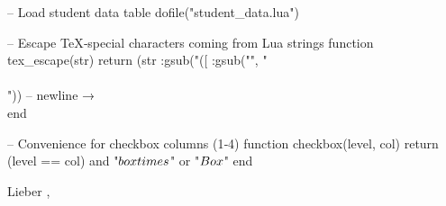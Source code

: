 



\renewcommand\cellalign{tl}  %


\begin{luacode*}
	-- Load student data table
	dofile("student_data.lua")
	
	-- Escape TeX‑special characters coming from Lua strings
	 function tex_escape(str)
	 return (str
		:gsub("([%
		:gsub("\n", "\\\\"))              -- newline → \\
  	 end
	
	-- Convenience for checkbox columns (1‑4)
	function checkbox(level, col)
	return (level == col) and "$\\boxtimes$" or "$\\Box$"
	end
\end{luacode*}

\newcommand{\headcol}[2]{\cellcolor{#1}\color{white}\bfseries #2}


	
	

	\newpage
	
	Lieber ,\\
	\newpage
	\vspace{1em}
	

